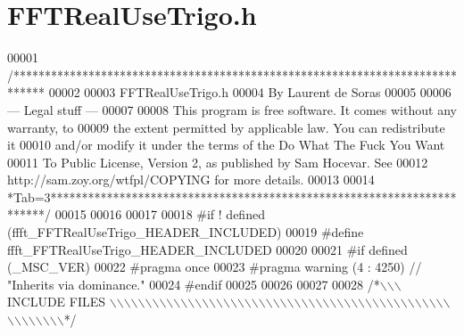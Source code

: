 \hypertarget{a00106_source}{\section{F\+F\+T\+Real\+Use\+Trigo.\+h}
\label{a00106_source}
}

\begin{DoxyCode}
00001 \textcolor{comment}{/*****************************************************************************}
00002 \textcolor{comment}{}
00003 \textcolor{comment}{        FFTRealUseTrigo.h}
00004 \textcolor{comment}{        By Laurent de Soras}
00005 \textcolor{comment}{}
00006 \textcolor{comment}{--- Legal stuff ---}
00007 \textcolor{comment}{}
00008 \textcolor{comment}{This program is free software. It comes without any warranty, to}
00009 \textcolor{comment}{the extent permitted by applicable law. You can redistribute it}
00010 \textcolor{comment}{and/or modify it under the terms of the Do What The Fuck You Want}
00011 \textcolor{comment}{To Public License, Version 2, as published by Sam Hocevar. See}
00012 \textcolor{comment}{http://sam.zoy.org/wtfpl/COPYING for more details.}
00013 \textcolor{comment}{}
00014 \textcolor{comment}{*Tab=3***********************************************************************/}
00015 
00016 
00017 
00018 \textcolor{preprocessor}{#if ! defined (ffft\_FFTRealUseTrigo\_HEADER\_INCLUDED)}
00019 \textcolor{preprocessor}{#define ffft\_FFTRealUseTrigo\_HEADER\_INCLUDED}
00020 
00021 \textcolor{preprocessor}{#if defined (\_MSC\_VER)}
00022 \textcolor{preprocessor}{    #pragma once}
00023 \textcolor{preprocessor}{    #pragma warning (4 : 4250) // "Inherits via dominance."}
00024 \textcolor{preprocessor}{#endif}
00025 
00026 
00027 
00028 \textcolor{comment}{/*\(\backslash\)\(\backslash\)\(\backslash\) INCLUDE FILES \(\backslash\)\(\backslash\)\(\backslash\)\(\backslash\)\(\backslash\)\(\backslash\)\(\backslash\)\(\backslash\)\(\backslash\)\(\backslash\)\(\backslash\)\(\backslash\)\(\backslash\)\(\backslash\)\(\backslash\)\(\backslash\)\(\backslash\)\(\backslash\)\(\backslash\)\(\backslash\)\(\backslash\)\(\backslash\)\(\backslash\)\(\backslash\)\(\backslash\)\(\backslash\)\(\backslash\)\(\backslash\)\(\backslash\)\(\backslash\)\(\backslash\)\(\backslash\)\(\backslash\)\(\backslash\)\(\backslash\)\(\backslash\)\(\backslash\)\(\backslash\)\(\backslash\)\(\backslash\)\(\backslash\)\(\backslash\)\(\backslash\)\(\backslash\)\(\backslash\)\(\backslash\)\(\backslash\)\(\backslash\)\(\backslash\)\(\backslash\)\(\backslash\)\(\backslash\)\(\backslash\)\(\backslash\)\(\backslash\)\(\backslash\)*/}

\end{DoxyCode}
